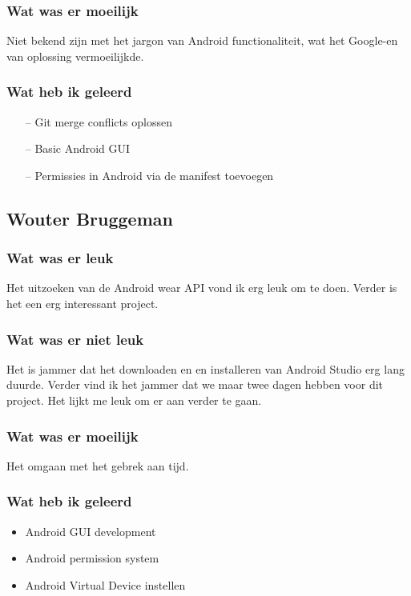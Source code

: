 \documentclass[../main.tex]{subfiles}
\begin{document}
\subsubsection{Wat was er moeilijk}
Niet bekend zijn met het jargon van Android functionaliteit, wat het Google-en van oplossing
vermoeilijkde.
\subsubsection{Wat heb ik geleerd}
\begin{itemize}
	\item[--] Git merge conflicts oplossen
	\item[--] Basic Android GUI
	\item[--] Permissies in Android via de manifest toevoegen
\end{itemize}
\newpage

\subsection{Wouter Bruggeman}
\subsubsection{Wat was er leuk}
Het uitzoeken van de Android wear API vond ik erg leuk om te doen. Verder is het een erg
interessant project.
\subsubsection{Wat was er niet leuk}
Het is jammer dat het downloaden en en installeren van Android Studio erg lang duurde.
Verder vind ik het jammer dat we maar twee dagen hebben voor dit project. Het lijkt me leuk
om er aan verder te gaan.
\subsubsection{Wat was er moeilijk}
Het omgaan met het gebrek aan tijd.
\subsubsection{Wat heb ik geleerd}
\begin{itemize}
	\item Android GUI development
	\item Android permission system
	\item Android Virtual Device instellen
\end{itemize}
\newpage
\end{document}
